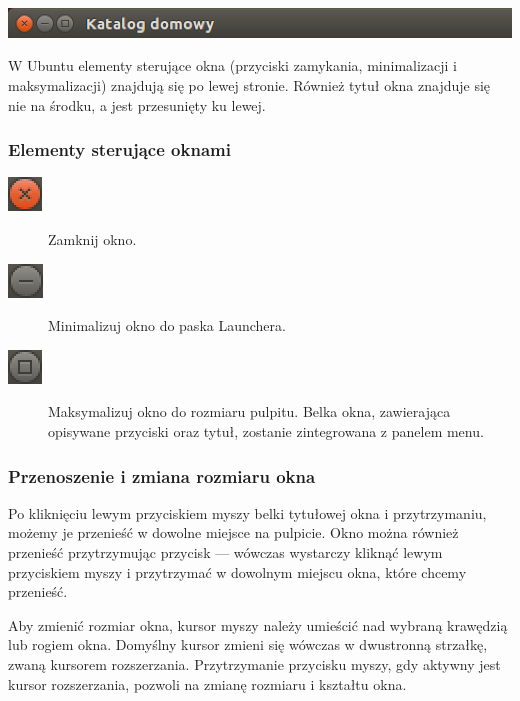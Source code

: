 \begin{center}
	\vspace{-10pt}
	\includegraphics[width=\linewidth]{images/unity_okno_belka.png}
\end{center}

W Ubuntu elementy sterujące okna (przyciski zamykania, minimalizacji i maksymalizacji) znajdują się po lewej stronie. Również tytuł okna znajduje się nie na środku, a jest przesunięty ku lewej.

\subsubsection{Elementy sterujące oknami}
\begin{description}
\item[\includegraphics{images/unity_okno_exit.png}] Zamknij okno.
\item[\includegraphics{images/unity_okno_min.png}] Minimalizuj okno do paska Launchera.
\item[\includegraphics{images/unity_okno_max.png}] Maksymalizuj okno do rozmiaru pulpitu. Belka okna, zawierająca opisywane przyciski oraz tytuł, zostanie zintegrowana z panelem menu.
\end{description}

\subsubsection{Przenoszenie i zmiana rozmiaru okna}
Po kliknięciu lewym przyciskiem myszy belki tytułowej okna i przytrzymaniu, możemy je przenieść w dowolne miejsce na pulpicie. Okno można również przenieść przytrzymując przycisk  --- wówczas wystarczy kliknąć lewym przyciskiem myszy i przytrzymać w dowolnym miejscu okna, które chcemy przenieść.

Aby zmienić rozmiar okna, kursor myszy należy umieścić nad wybraną krawędzią lub rogiem okna. Domyślny kursor zmieni się wówczas w dwustronną strzałkę, zwaną kursorem rozszerzania. Przytrzymanie przycisku myszy, gdy aktywny jest kursor rozszerzania, pozwoli na zmianę rozmiaru i kształtu okna.

